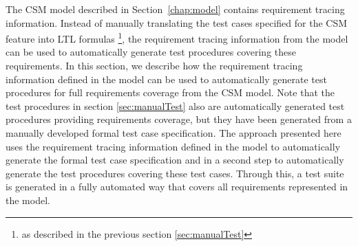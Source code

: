 
The CSM model described in Section~\ref{chap:model} contains
requirement tracing information. Instead of manually translating the
test cases specified for the CSM feature into LTL formulas
\footnote{as described in the previous section \ref{sec:manualTest}},
the requirement tracing information from the model can be
used to automatically generate test procedures covering these
requirements.
In this section, we describe how the requirement tracing information
defined in the model can be used to automatically generate test
procedures for full requirements coverage from the CSM model.
Note that the test procedures in section \ref{sec:manualTest} also are
automatically generated test procedures providing requirements coverage,
but they have been generated from a manually developed formal test
case specification. The approach presented here uses the requirement
tracing information defined in the model to automatically generate
the formal test case specification and in a second step to
automatically generate the test procedures covering these test cases.
Through this, a test suite is generated in a fully automated way
that covers all requirements represented in the model.

